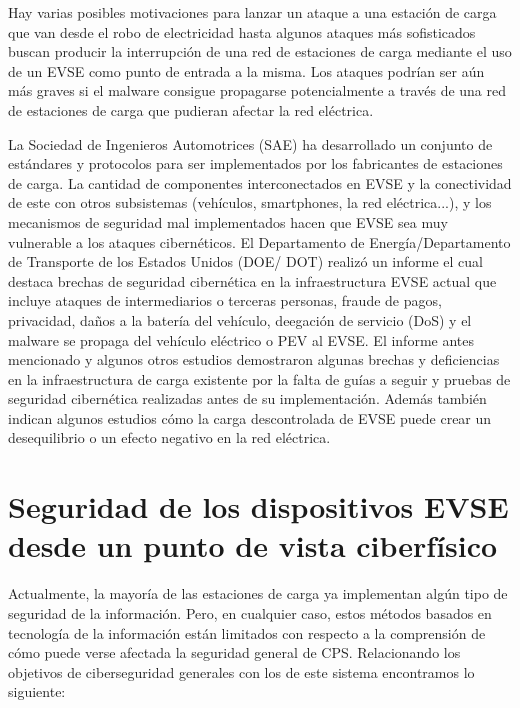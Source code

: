 \documentclass[12pt,a4paper,onecolumn,oneside]{report}
\begin{document}
Hay varias posibles motivaciones para lanzar un ataque a una estación de carga que van desde el robo de electricidad hasta algunos ataques más sofisticados buscan producir la interrupción de una red de estaciones de carga mediante el uso de un EVSE como punto de entrada a la misma. Los ataques podrían ser aún más graves si el malware consigue propagarse potencialmente a través de una red de estaciones de carga que pudieran afectar la red eléctrica.

La Sociedad de Ingenieros Automotrices (SAE) ha desarrollado un conjunto de estándares y protocolos para ser implementados por los fabricantes de estaciones de carga. La cantidad de componentes interconectados en EVSE y la conectividad de este con otros subsistemas (vehículos, smartphones, la red eléctrica...), y los mecanismos de seguridad mal implementados hacen que EVSE sea muy vulnerable a los ataques cibernéticos. El Departamento de Energía/Departamento de Transporte de los Estados Unidos (DOE/ DOT) realizó un informe el cual destaca brechas de seguridad cibernética en la infraestructura EVSE actual que incluye ataques de intermediarios o terceras personas, fraude de pagos, privacidad, daños a la batería del vehículo, deegación de servicio (DoS) y el malware se propaga del vehículo eléctrico o PEV al EVSE. El informe antes mencionado y algunos otros estudios \cite{once}\cite{doce}\cite{trece} demostraron algunas brechas y deficiencias en la infraestructura de carga existente por la falta de guías a seguir y pruebas de seguridad cibernética realizadas antes de su implementación. Además también indican algunos estudios cómo la carga descontrolada de EVSE puede crear un desequilibrio o un efecto negativo en la red eléctrica.


\section{Seguridad de los dispositivos EVSE desde un punto de vista ciberfísico}
\label{Seguridad de los dispositivos EVSE desde un punto de vista ciberfísico}

Actualmente, la mayoría de las estaciones de carga ya implementan algún tipo de seguridad de la información. Pero, en cualquier caso, estos métodos basados en tecnología de la información están limitados con respecto a la comprensión de cómo puede verse afectada la seguridad general de CPS. Relacionando los objetivos de ciberseguridad generales con los de este sistema encontramos lo siguiente:
\end{document}
